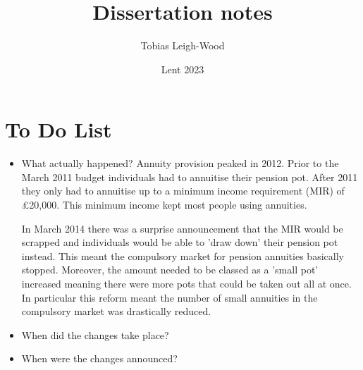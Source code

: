 \documentclass[12pt]{article}
\date{Lent 2023}
\title{Dissertation notes}
\author{Tobias Leigh-Wood}
\begin{document}
\maketitle

\section*{To Do List}
\begin{itemize}
    \item What actually happened?
          Annuity provision peaked in 2012. Prior to the March 2011 budget individuals had to annuitise their pension pot.
          After 2011 they only had to annuitise up to a minimum income requirement (MIR) of £20,000. This minimum income kept most people using annuities.

          In March 2014 there was a surprise announcement that the MIR would be scrapped and individuals would be able to 'draw down' their pension pot instead.
          This meant the compulsory market for pension annuities basically stopped. Moreover, the amount needed to be classed as a 'small pot' increased meaning there were more pots that could be taken out all at once.
          In particular this reform meant the number of small annuities in the compulsory market was drastically reduced.


    \item When did the changes take place?
    \item When were the changes announced?
\end{itemize}
\end{document}
